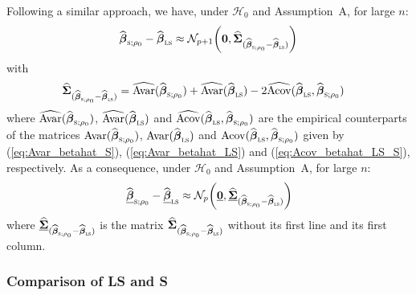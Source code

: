 Following a similar approach, we have, under $\mathcal{H}_0$ and Assumption~A, 
for large $n$:
\[
    \sthat{\boldsymbol\beta}_{\stsc{S};\rho_0} 
        - \sthat{\boldsymbol\beta}_\stsc{LS}
    \approx\mathcal{N}_{p+1} \left(\stvec{0},
        \sthat{\boldsymbol\Sigma}_{(\sthat{\boldsymbol\beta}_{\stsc{S};\rho_0}
            - \sthat{\boldsymbol\beta}_\stsc{LS})}
    \right)
\]
with
%
\begin{align}
    \label{eq:Hausman_sigmahat_S-LS}
    \sthat{\boldsymbol\Sigma}_{(\sthat{\boldsymbol\beta}_{\stsc{S};\rho_0}
        - \sthat{\boldsymbol\beta}_\stsc{LS})}
    & = \sthat{\mathrm{Avar}}(\sthat{\boldsymbol\beta}_{\stsc{S};\rho_0})
      + \sthat{\mathrm{Avar}}(\sthat{\boldsymbol{\beta}}_\stsc{LS})
    - 2 \sthat{\mathrm{Acov}}(\sthat{\boldsymbol\beta}_\stsc{LS},
        \sthat{\boldsymbol\beta}_{\stsc{S};\rho_0})
\end{align}
%
where 
$\sthat{\mathrm{Avar}}(\sthat{\boldsymbol\beta}_{\stsc{S};\rho_0})$, 
$\sthat{\mathrm{Avar}}(\sthat{\boldsymbol{\beta}}_\stsc{LS})$ and 
$\sthat{\mathrm{Acov}}(\sthat{\boldsymbol\beta}_\stsc{LS},
\sthat{\boldsymbol\beta}_{\stsc{S};\rho_0})$ are the
empirical counterparts of the matrices 
$\mathrm{Avar}(\sthat{\boldsymbol\beta}_{\stsc{S};\rho_0})$, 
$\mathrm{Avar}(\sthat{\boldsymbol{\beta}}_\stsc{LS})$ and 
$\mathrm{Acov}(\sthat{\boldsymbol\beta}_\stsc{LS},
\sthat{\boldsymbol\beta}_{\stsc{S};\rho_0})$ 
given by (\ref{eq:Avar_betahat_S}), (\ref{eq:Avar_betahat_LS}) and
(\ref{eq:Acov_betahat_LS_S}), respectively. As a consequence, under
$\mathcal{H}_0$ and Assumption~A, for large $n$:
%
\begin{equation}
    \label{eq:Hausman_normality_S-LS}
    \sthat{\underline{\boldsymbol\beta}}_{\stsc{S};\rho_0} 
        - \sthat{\underline{\boldsymbol\beta}}_\stsc{LS}
    \approx\mathcal{N}_p \left(\underline{\stvec{0}},
        \sthat{\underline{\boldsymbol\Sigma}}_{(\sthat{\boldsymbol\beta}_{\stsc{S};\rho_0}
            - \sthat{\boldsymbol\beta}_\stsc{LS})}
    \right)
\end{equation}
%
where 
$\sthat{\underline{\boldsymbol\Sigma}}_{(\sthat{\boldsymbol\beta}_{\stsc{S};\rho_0}
- \sthat{\boldsymbol\beta}_\stsc{LS})}$
is the matrix 
$\sthat{\boldsymbol\Sigma}_{(\sthat{\boldsymbol\beta}_{\stsc{S};\rho_0}
- \sthat{\boldsymbol\beta}_\stsc{LS})}$ 
without its first line and its first column.

\subsubsection{Comparison of LS and S}

